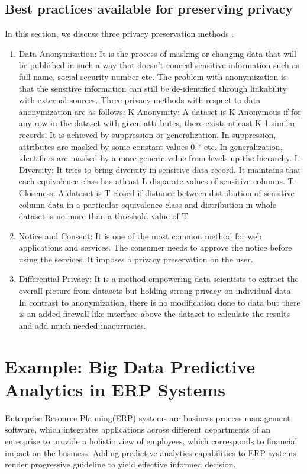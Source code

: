 \documentclass[runningheads]{llncs}
\begin{document}
\subsection{Best practices available for preserving privacy}
In this section, we discuss three privacy preservation methods \cite{16}.
\begin{enumerate}
	\item Data Anonymization: It is the process of masking or changing data that will be published in such a way that doesn't conceal sensitive information such as full name, social security number etc. The problem with anonymization is that the sensitive information can still be de-identified through linkability with external sources. Three privacy methods with respect to data anonymization are as follows:
	\subitem K-Anonymity: A dataset is K-Anonymous if for any row in the dataset with given attributes, there exists atleast K-1 similar records. It is achieved by suppression or generalization.
	In suppression, attributes are masked by some constant values 0,* etc.
	In generalization, identifiers are masked by a more generic value from levels up the hierarchy.
	\subitem L-Diversity: It tries to bring diversity in sensitive data record. It maintains that each equivalence class has atleast L disparate values of sensitive columns.
	\subitem T-Closeness: A dataset is T-closed if distance between distribution of sensitive column data in a particular equivalence class and distribution in whole dataset is no more than a threshold value of T.
	\item Notice and Consent: It is one of the most common method for web applications and services. The consumer needs to approve the notice before using the services. It imposes a privacy preservation on the user.
	\item Differential Privacy: It is a method empowering data scientists to extract the overall picture from datasets but holding strong privacy on individual data. In contrast to anonymization, there is no modification done to data but there is an added firewall-like interface above the dataset to calculate the results and add much needed inacurracies.
\end{enumerate}

\section{Example: Big Data Predictive Analytics in ERP Systems}
Enterprise Resource Planning(ERP) systems are business process management software, which integrates applications across different departments of an enterprise to provide a holistic view of employees, which corresponds to financial impact on the business. Adding predictive analytics capabilities to ERP systems render progressive guideline to yield effective informed decision. 
\end{document}
